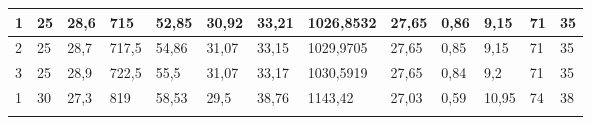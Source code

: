 \begin{table}[H]
{\begin{tabular}{|l|llll|lll|ll|l|ll|}
\rowcolor[HTML]{E2EFDA} 
1             & \multicolumn{1}{l|}{\cellcolor[HTML]{E2EFDA}25}               & \multicolumn{1}{l|}{\cellcolor[HTML]{E2EFDA}28,6}             & \multicolumn{1}{l|}{\cellcolor[HTML]{E2EFDA}715}              & 52,85             & \multicolumn{1}{l|}{\cellcolor[HTML]{E2EFDA}30,92}             & \multicolumn{1}{l|}{\cellcolor[HTML]{E2EFDA}33,21}             & 1026,8532         & \multicolumn{1}{l|}{\cellcolor[HTML]{E2EFDA}27,65}            & 0,86             & 9,15                      & \multicolumn{1}{l|}{\cellcolor[HTML]{E2EFDA}71}                  & 35               \\ \hline
\rowcolor[HTML]{C6E0B4} 
2             & \multicolumn{1}{l|}{\cellcolor[HTML]{C6E0B4}25}               & \multicolumn{1}{l|}{\cellcolor[HTML]{C6E0B4}28,7}             & \multicolumn{1}{l|}{\cellcolor[HTML]{C6E0B4}717,5}            & 54,86             & \multicolumn{1}{l|}{\cellcolor[HTML]{C6E0B4}31,07}             & \multicolumn{1}{l|}{\cellcolor[HTML]{C6E0B4}33,15}             & 1029,9705         & \multicolumn{1}{l|}{\cellcolor[HTML]{C6E0B4}27,65}            & 0,85             & 9,15                      & \multicolumn{1}{l|}{\cellcolor[HTML]{C6E0B4}71}                  & 35               \\ \hline
\rowcolor[HTML]{E2EFDA} 
3             & \multicolumn{1}{l|}{\cellcolor[HTML]{E2EFDA}25}               & \multicolumn{1}{l|}{\cellcolor[HTML]{E2EFDA}28,9}             & \multicolumn{1}{l|}{\cellcolor[HTML]{E2EFDA}722,5}            & 55,5              & \multicolumn{1}{l|}{\cellcolor[HTML]{E2EFDA}31,07}             & \multicolumn{1}{l|}{\cellcolor[HTML]{E2EFDA}33,17}             & 1030,5919         & \multicolumn{1}{l|}{\cellcolor[HTML]{E2EFDA}27,65}            & 0,84             & 9,2                       & \multicolumn{1}{l|}{\cellcolor[HTML]{E2EFDA}71}                  & 35               \\ \hline
\rowcolor[HTML]{C6E0B4} 
1             & \multicolumn{1}{l|}{\cellcolor[HTML]{C6E0B4}30}               & \multicolumn{1}{l|}{\cellcolor[HTML]{C6E0B4}27,3}             & \multicolumn{1}{l|}{\cellcolor[HTML]{C6E0B4}819}              & 58,53             & \multicolumn{1}{l|}{\cellcolor[HTML]{C6E0B4}29,5}              & \multicolumn{1}{l|}{\cellcolor[HTML]{C6E0B4}38,76}             & 1143,42           & \multicolumn{1}{l|}{\cellcolor[HTML]{C6E0B4}27,03}            & 0,59             & 10,95                     & \multicolumn{1}{l|}{\cellcolor[HTML]{C6E0B4}74}                  & 38               \\ \hline
\rowcolor[HTML]{E2EFDA} 

\end{tabular}}
\end{table}
